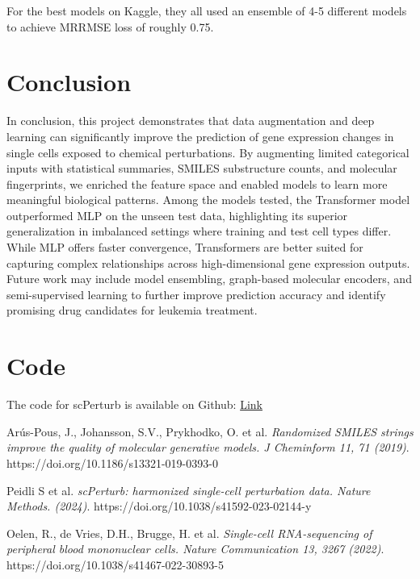 \documentclass[11pt, oneside]{article}   	%
\begin{document}
For the best models on Kaggle, they all used an ensemble of 4-5 different models to achieve MRRMSE loss of roughly 0.75. 



\section*{Conclusion}

In conclusion, this project demonstrates that data augmentation and deep learning can significantly improve the prediction of gene expression changes in single cells exposed to chemical perturbations. By augmenting limited categorical inputs with statistical summaries, SMILES substructure counts, and molecular fingerprints, we enriched the feature space and enabled models to learn more meaningful biological patterns. Among the models tested, the Transformer model outperformed MLP on the unseen test data, highlighting its superior generalization in imbalanced settings where training and test cell types differ. While MLP offers faster convergence, Transformers are better suited for capturing complex relationships across high-dimensional gene expression outputs. Future work may include model ensembling, graph-based molecular encoders, and semi-supervised learning to further improve prediction accuracy and identify promising drug candidates for leukemia treatment.




\section*{Code}

The code for scPerturb is available on Github: 
\href{https://github.com/tigeryi1998/scPerturb}{Link}





\begin{thebibliography}{9}

Arús-Pous, J., Johansson, S.V., Prykhodko, O. et al.
\textit{Randomized SMILES strings improve the quality of molecular generative models. J Cheminform 11, 71 (2019)}. https://doi.org/10.1186/s13321-019-0393-0


Peidli S et al.
\textit{scPerturb: harmonized single-cell perturbation data. Nature Methods. (2024)}.
https://doi.org/10.1038/s41592-023-02144-y


Oelen, R., de Vries, D.H., Brugge, H. et al.
\textit{Single-cell RNA-sequencing of peripheral blood mononuclear cells. Nature Communication 13, 3267 (2022)}.
https://doi.org/10.1038/s41467-022-30893-5





\end{thebibliography}
\end{document}
